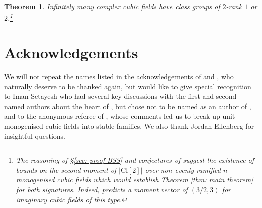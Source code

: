 \documentclass[a4paper, 12pt]{amsart}
\newtheorem{theorem}{Theorem}
\newcommand{\Cl}{\mathrm{Cl}}
\begin{document}
\begin{theorem}
    Infinitely many complex cubic fields have class groups of $2$-rank $1$ or $2$.\footnote{The reasoning of \S \ref{sec: proof BSS} and conjectures of \cite{SiadVenkatesh} suggest the existence of bounds on the second moment of $\lvert \Cl[2] \rvert$ over non-evenly ramified $n$-monogenised cubic fields which would establish Theorem \ref{thm: main theorem} for both signatures. Indeed, \cite{SiadVenkatesh} predicts a moment vector of $(3/2,3)$ for imaginary cubic fields of this type.}
\end{theorem}




\section*{Acknowledgements}

We will not repeat the names listed in the acknowledgements of \cite{MR4891959} and \cite{2506.05539}, who naturally deserve to be thanked again, but would like to give special recognition to Iman Setayesh who had several key discussions with the first and second named authors about the heart of \cite{MR1230290}, but chose not to be named as an author of \cite{MR4891959}, and to the anonymous referee of \cite{MR4891959}, whose comments led us to break up unit-monogenised cubic fields into stable families. We also thank Jordan Ellenberg for insightful questions.



\end{document}
